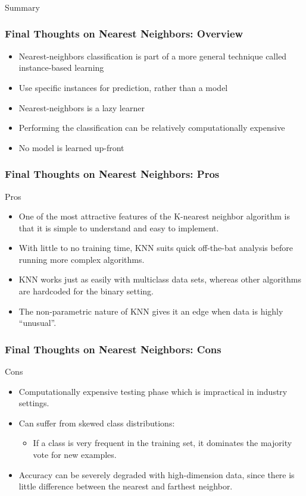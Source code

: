 \begin{frame}[fragile]\frametitle{}
\begin{center}
{\Large Summary}
\end{center}
\end{frame}

\begin{frame}[fragile]\frametitle{Final Thoughts on Nearest Neighbors: Overview}
\begin{itemize}
\item Nearest-neighbors classification is part of a more general technique called instance-based learning
\item Use specific instances for prediction, rather than a model
\item Nearest-neighbors is a lazy learner
\item Performing the classification can be relatively computationally expensive
\item No model is learned up-front
\end{itemize}
\end{frame}

\begin{frame}[fragile]\frametitle{Final Thoughts on Nearest Neighbors: Pros}
Pros
\begin{itemize}
\item One of the most attractive features of the K-nearest neighbor algorithm is that it is simple to understand and easy to implement.
\item With little to no training time, KNN suits quick off-the-bat analysis before running more complex algorithms.
\item KNN works just as easily with multiclass data sets, whereas other algorithms are hardcoded for the binary setting.
\item The non-parametric nature of KNN gives it an edge when data is highly ``unusual''.
\end{itemize}
\end{frame}

\begin{frame}[fragile]\frametitle{Final Thoughts on Nearest Neighbors: Cons}
Cons
\begin{itemize}
\item Computationally expensive testing phase which is impractical in industry settings.
\item Can suffer from skewed class distributions:
	\begin{itemize}
	\item If a class is very frequent in the training set, it dominates the majority vote for new examples.
	\end{itemize}
\item Accuracy can be severely degraded with high-dimension data, since there is little difference between the nearest and farthest neighbor.
\end{itemize}
\end{frame}


